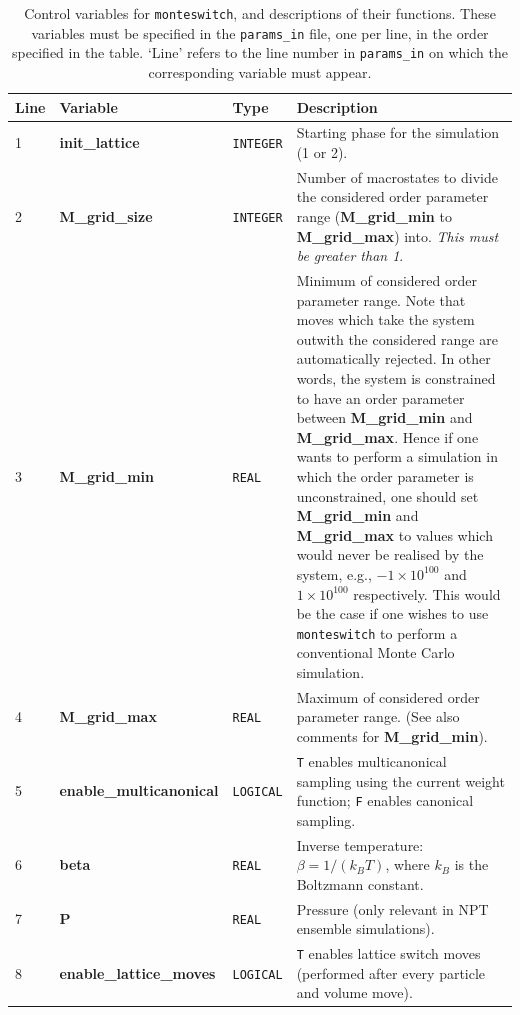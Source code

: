 \documentclass{report}
\begin{document}
\begin{landscape}
\begin{center}\label{table:params_in_variables}
\begin{longtable}{l l l p{8cm}}
\caption{Control variables for \texttt{monteswitch}, and descriptions of their functions. These variables must be specified in the \texttt{params\_in} file, 
one per line, in the order specified in the table. `Line' refers to the line number in \texttt{params\_in} on which the corresponding variable must appear.}
\\

Line & Variable & Type & Description \\
\hline
1 & \textbf{init\_lattice}  &  \texttt{INTEGER}  & Starting phase for the simulation (1 or 2). \\
2 & \textbf{M\_grid\_size}  &  \texttt{INTEGER}  & Number of macrostates to divide the considered order parameter range (\textbf{M\_grid\_min} to 
\textbf{M\_grid\_max}) into. \emph{This must be greater than 1}. \\
3 & \textbf{M\_grid\_min}  &  \texttt{REAL}  & Minimum of considered order parameter range. Note that moves which take the system outwith the considered 
range are automatically rejected. In other words, the system is constrained to have an order parameter between \textbf{M\_grid\_min} and 
\textbf{M\_grid\_max}. Hence
if one wants to perform a simulation in which the order parameter is unconstrained, one should set \textbf{M\_grid\_min} and \textbf{M\_grid\_max} to
values which would never be realised by the system, e.g., $-1\times 10^{100}$ and $1\times 10^{100}$ respectively. This would be the case if one wishes
to use \texttt{monteswitch} to perform a conventional Monte Carlo simulation. \\
4 & \textbf{M\_grid\_max}  &  \texttt{REAL}  & Maximum of considered order parameter range. (See also comments for \textbf{M\_grid\_min}).  \\
5 & \textbf{enable\_multicanonical}  &  \texttt{LOGICAL}  & \texttt{T} enables multicanonical sampling using the current weight function; \texttt{F} 
enables canonical sampling. \\
6 & \textbf{beta}  &  \texttt{REAL}  & Inverse temperature: $\beta=1/(k_BT)$, where $k_B$ is the Boltzmann constant.  \\
7 & \textbf{P}  &  \texttt{REAL}  & Pressure (only relevant in NPT ensemble simulations).  \\
8 & \textbf{enable\_lattice\_moves}  &  \texttt{LOGICAL}  & \texttt{T} enables lattice switch moves (performed after every particle and volume move). \\

\end{longtable}
\end{center}
\end{landscape}
\end{document}
